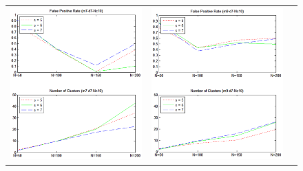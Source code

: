 \begin{frame}
\begin{figure}
\begin{tabular}{ccc}
            \includegraphics[scale=0.23]{figures/model-configuration02} &
            \includegraphics[scale=0.23]{figures/model-configuration03}\\

\end{tabular}
\end{figure}
\end{frame}
